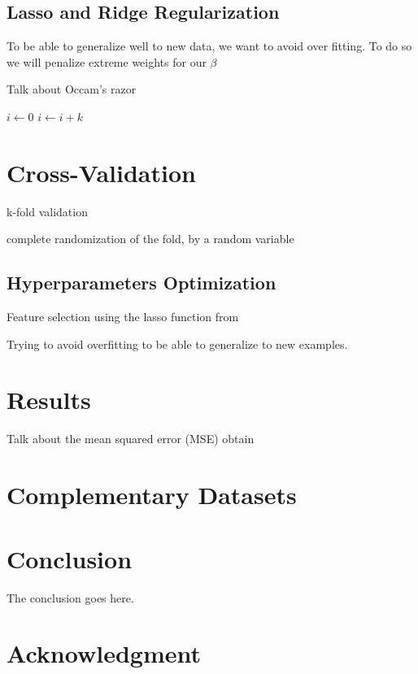 \documentclass[conference]{IEEEtran}
\begin{document}
\subsection{Lasso and Ridge Regularization}

To be able to generalize well to new data, we want to avoid over fitting. To do
so we will penalize extreme weights for our $\beta$

Talk about Occam's razor


\begin{algorithmic}
    \State $i\gets 0$
\Else
        \State $i\gets i+k$
    \EndIf
\EndIf
\end{algorithmic}

\section{Cross-Validation}

k-fold validation

complete randomization of the fold, by a random variable

\subsection{Hyperparameters Optimization}

Feature selection using the lasso function from \cite{scikit-learn}

Trying to avoid overfitting to be able to generalize to new examples.

\section{Results}

Talk about the mean squared error (MSE) obtain 

\section{Complementary Datasets}


\section{Conclusion}
The conclusion goes here.






\section*{Acknowledgment}
\end{document}

